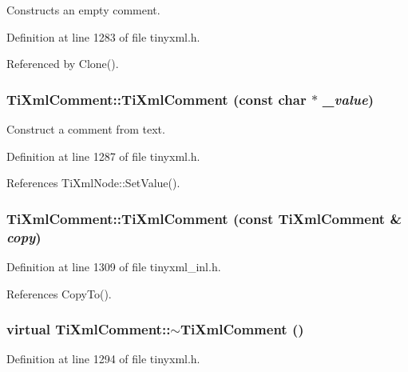 Constructs an empty comment. 

Definition at line 1283 of file tinyxml.h.

Referenced by Clone().\hypertarget{class_ti_xml_comment_a37e7802ef17bc03ebe5ae79bf0713d47}{
\subsubsection[{TiXmlComment}]{\setlength{\rightskip}{0pt plus 5cm}TiXmlComment::TiXmlComment (const char $\ast$ {\em \_\-value})}}
\label{class_ti_xml_comment_a37e7802ef17bc03ebe5ae79bf0713d47}


Construct a comment from text. 

Definition at line 1287 of file tinyxml.h.

References TiXmlNode::SetValue().\hypertarget{class_ti_xml_comment_afaec41ac2760ce946ba1590eb5708e50}{
\subsubsection[{TiXmlComment}]{\setlength{\rightskip}{0pt plus 5cm}TiXmlComment::TiXmlComment (const {\bf TiXmlComment} \& {\em copy})}}
\label{class_ti_xml_comment_afaec41ac2760ce946ba1590eb5708e50}


Definition at line 1309 of file tinyxml\_\-inl.h.

References CopyTo().\hypertarget{class_ti_xml_comment_a3264ae2e9c4a127edfa03289bb2c9aa2}{
\subsubsection[{$\sim$TiXmlComment}]{\setlength{\rightskip}{0pt plus 5cm}virtual TiXmlComment::$\sim$TiXmlComment ()}}
\label{class_ti_xml_comment_a3264ae2e9c4a127edfa03289bb2c9aa2}


Definition at line 1294 of file tinyxml.h.

